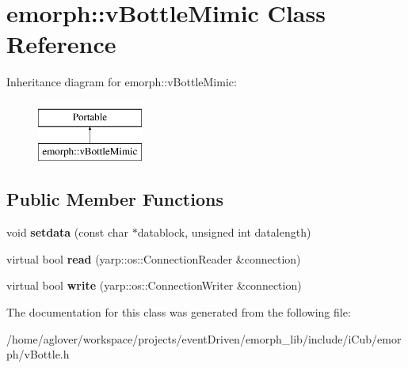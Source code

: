 \hypertarget{classemorph_1_1vBottleMimic}{\section{emorph\-:\-:v\-Bottle\-Mimic Class Reference}
\label{classemorph_1_1vBottleMimic}
}
Inheritance diagram for emorph\-:\-:v\-Bottle\-Mimic\-:\begin{figure}[H]
\begin{center}
\leavevmode
\includegraphics[height=2.000000cm]{classemorph_1_1vBottleMimic}
\end{center}
\end{figure}
\subsection*{Public Member Functions}
\begin{DoxyCompactItemize}
\item 
\hypertarget{classemorph_1_1vBottleMimic_ace7355fd2d178bbd899694ba81e3222b}{void {\bfseries setdata} (const char $\ast$datablock, unsigned int datalength)}\label{classemorph_1_1vBottleMimic_ace7355fd2d178bbd899694ba81e3222b}

\item 
\hypertarget{classemorph_1_1vBottleMimic_ae97dabc0425bae4aaaa1679100e36885}{virtual bool {\bfseries read} (yarp\-::os\-::\-Connection\-Reader \&connection)}\label{classemorph_1_1vBottleMimic_ae97dabc0425bae4aaaa1679100e36885}

\item 
\hypertarget{classemorph_1_1vBottleMimic_af930ab7e4e14992dd2182b4c46e2a5d1}{virtual bool {\bfseries write} (yarp\-::os\-::\-Connection\-Writer \&connection)}\label{classemorph_1_1vBottleMimic_af930ab7e4e14992dd2182b4c46e2a5d1}

\end{DoxyCompactItemize}


The documentation for this class was generated from the following file\-:\begin{DoxyCompactItemize}
\item 
/home/aglover/workspace/projects/event\-Driven/emorph\-\_\-lib/include/i\-Cub/emorph/v\-Bottle.\-h\end{DoxyCompactItemize}

